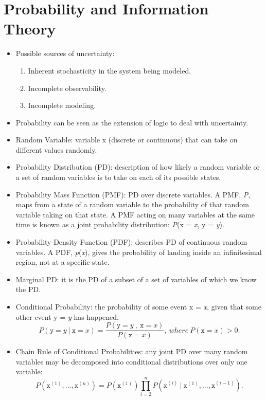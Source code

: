 \documentclass{article}
\begin{document}
\section{Probability and Information Theory}
\begin{itemize}
\item Possible sources of uncertainty:
\begin{enumerate}
\item Inherent stochasticity in the system being modeled.
\item Incomplete observability.
\item Incomplete modeling.
\end{enumerate}
\item Probability can be seen as the extension of logic to deal with uncertainty.
\item Random Variable: variable x (discrete or continuous) that can take on different values randomly.
\item Probability Distribution (PD): description of how likely a random variable or a set of random variables is to take on each of its possible states.
\item Probability Mass Function (PMF): PD over discrete variables. A PMF, \textit{P}, maps from a state of a random variable to the probability of that random variable taking on that state. A PMF acting on many variables at the same time is known as a joint probability distribution: \textit{P}(x = \textit{x}, y = \textit{y}).
\item Probability Density Function (PDF): describes PD of continuous random variables. A PDF, \textit{p}(\textit{x}), gives the probability of landing inside an infinitesimal region, not at a specific state.
\item Marginal PD: it is the PD of a subset of a set of variables of which we know the PD.
\item Conditional Probability: the probability of some event x = \textit{x}, given that some other event y = \textit{y} has happened. 
\[
	P(\mathtt{y} = y\ | \  \mathtt{x} = x) = \frac{P(\mathtt{y}= y \ ,\  \mathtt{x} = x)}{P(\mathtt{x} = x)},\  where\  P(\mathtt{x} = x) > 0.
\]
\item Chain Rule of Conditional Probabilities: any joint PD over many random variables may be decomposed into conditional distributions over only one variable:\\ 
\[
	P(\mathtt{x}^{(1)},\ldots, \mathtt{x}^{(n)}) = P(\mathtt{x}^{(1)})\prod_{i=2}^nP(\mathtt{x}^{(i)}\ | \ \mathtt{x}^{(1)},\ldots, \mathtt{x}^{(i-1)}).
\]
\end{itemize}
\end{document}
